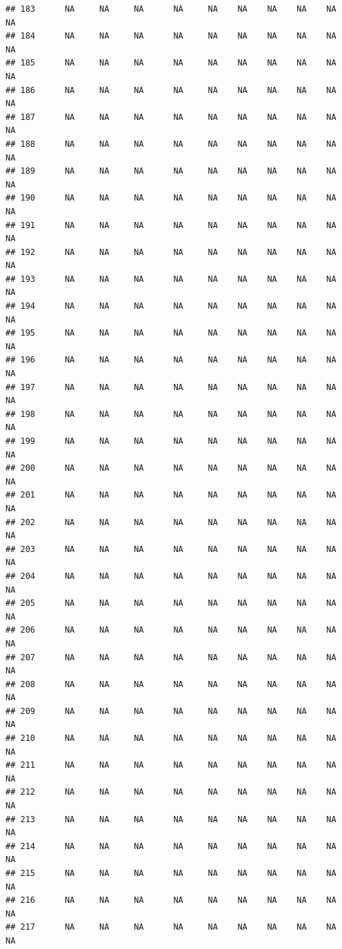 \documentclass{article}\usepackage{graphicx, color}
\makeatletter
\newenvironment{kframe}{%
 \def\at@end@of@kframe{}%
 \ifinner\ifhmode%
  \def\at@end@of@kframe{\end{minipage}}%
  \begin{minipage}{\columnwidth}%
 \fi\fi%
 \def\FrameCommand##1{\hskip\@totalleftmargin \hskip-\fboxsep
 \colorbox{shadecolor}{##1}\hskip-\fboxsep
     \hskip-\linewidth \hskip-\@totalleftmargin \hskip\columnwidth}%
 \MakeFramed {\advance\hsize-\width
   \@totalleftmargin\z@ \linewidth\hsize
   \@setminipage}}%
 {\par\unskip\endMakeFramed%
 \at@end@of@kframe}
\newenvironment{knitrout}{}{} %
\makeatother
\begin{document}
\begin{knitrout}
\begin{kframe}
\begin{verbatim}
## 183      NA     NA     NA      NA     NA    NA    NA    NA    NA     NA
## 184      NA     NA     NA      NA     NA    NA    NA    NA    NA     NA
## 185      NA     NA     NA      NA     NA    NA    NA    NA    NA     NA
## 186      NA     NA     NA      NA     NA    NA    NA    NA    NA     NA
## 187      NA     NA     NA      NA     NA    NA    NA    NA    NA     NA
## 188      NA     NA     NA      NA     NA    NA    NA    NA    NA     NA
## 189      NA     NA     NA      NA     NA    NA    NA    NA    NA     NA
## 190      NA     NA     NA      NA     NA    NA    NA    NA    NA     NA
## 191      NA     NA     NA      NA     NA    NA    NA    NA    NA     NA
## 192      NA     NA     NA      NA     NA    NA    NA    NA    NA     NA
## 193      NA     NA     NA      NA     NA    NA    NA    NA    NA     NA
## 194      NA     NA     NA      NA     NA    NA    NA    NA    NA     NA
## 195      NA     NA     NA      NA     NA    NA    NA    NA    NA     NA
## 196      NA     NA     NA      NA     NA    NA    NA    NA    NA     NA
## 197      NA     NA     NA      NA     NA    NA    NA    NA    NA     NA
## 198      NA     NA     NA      NA     NA    NA    NA    NA    NA     NA
## 199      NA     NA     NA      NA     NA    NA    NA    NA    NA     NA
## 200      NA     NA     NA      NA     NA    NA    NA    NA    NA     NA
## 201      NA     NA     NA      NA     NA    NA    NA    NA    NA     NA
## 202      NA     NA     NA      NA     NA    NA    NA    NA    NA     NA
## 203      NA     NA     NA      NA     NA    NA    NA    NA    NA     NA
## 204      NA     NA     NA      NA     NA    NA    NA    NA    NA     NA
## 205      NA     NA     NA      NA     NA    NA    NA    NA    NA     NA
## 206      NA     NA     NA      NA     NA    NA    NA    NA    NA     NA
## 207      NA     NA     NA      NA     NA    NA    NA    NA    NA     NA
## 208      NA     NA     NA      NA     NA    NA    NA    NA    NA     NA
## 209      NA     NA     NA      NA     NA    NA    NA    NA    NA     NA
## 210      NA     NA     NA      NA     NA    NA    NA    NA    NA     NA
## 211      NA     NA     NA      NA     NA    NA    NA    NA    NA     NA
## 212      NA     NA     NA      NA     NA    NA    NA    NA    NA     NA
## 213      NA     NA     NA      NA     NA    NA    NA    NA    NA     NA
## 214      NA     NA     NA      NA     NA    NA    NA    NA    NA     NA
## 215      NA     NA     NA      NA     NA    NA    NA    NA    NA     NA
## 216      NA     NA     NA      NA     NA    NA    NA    NA    NA     NA
## 217      NA     NA     NA      NA     NA    NA    NA    NA    NA     NA

\end{verbatim}
\end{kframe}
\end{knitrout}
\end{document}
